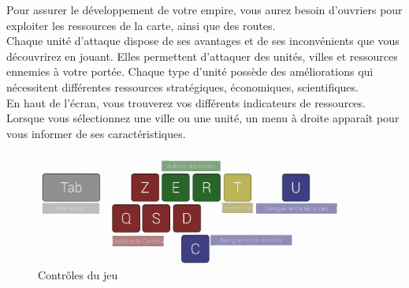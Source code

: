 \documentclass[a5paper, 10pt, twoside]{article}
\begin{document}
Pour assurer le développement de votre empire, vous aurez besoin d'ouvriers
pour exploiter les ressources de la carte, ainsi que des routes.\\

Chaque unité d'attaque dispose de ses avantages et de ses inconvénients que
vous découvrirez en jouant. Elles permettent d'attaquer des unités, villes et
ressources ennemies à votre portée. Chaque type d'unité possède des
améliorations qui nécessitent différentes ressources stratégiques, économiques,
scientifiques.\\

En haut de l'écran, vous trouverez vos différents indicateurs de ressources.
Lorsque vous sélectionnez une ville ou une unité, un menu à droite apparaît
pour vous informer de ses caractéristiques.\\

\begin{figure}[H]
    \centering
    \includegraphics[width=0.9\textwidth]{controls}
    \caption*{Contrôles du jeu}
\end{figure}
\end{document}
